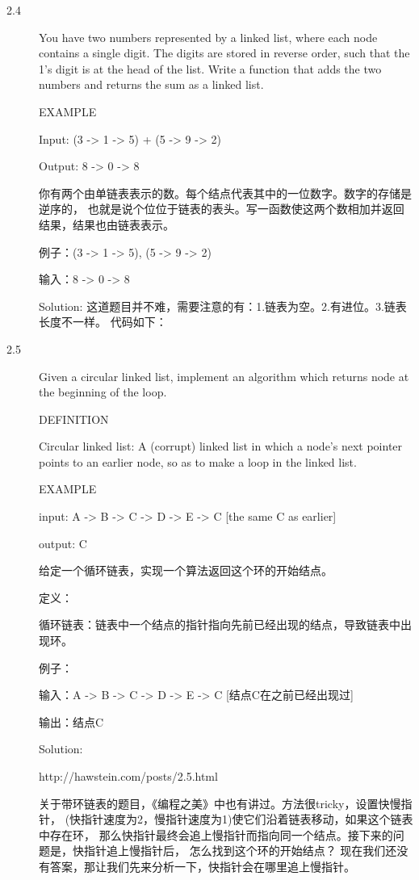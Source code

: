 \begin{description}



\item[2.4] You have two numbers represented by a linked list, where each node contains a single digit. The digits are stored in reverse order, such that the 1’s digit is at the head of the list. Write a function that adds the two numbers and returns the sum as a linked list.

EXAMPLE

Input: (3 -> 1 -> 5) + (5 -> 9 -> 2)

Output: 8 -> 0 -> 8

你有两个由单链表表示的数。每个结点代表其中的一位数字。数字的存储是逆序的， 也就是说个位位于链表的表头。写一函数使这两个数相加并返回结果，结果也由链表表示。

例子：(3 -> 1 -> 5), (5 -> 9 -> 2)

输入：8 -> 0 -> 8

Solution:
这道题目并不难，需要注意的有：1.链表为空。2.有进位。3.链表长度不一样。 代码如下：




\item[2.5] Given a circular linked list, implement an algorithm which returns node at the beginning of the loop.

DEFINITION

Circular linked list: A (corrupt) linked list in which a node’s next pointer points to an earlier node, so as to make a loop in the linked list.

EXAMPLE

input: A -> B -> C -> D -> E -> C [the same C as earlier]

output: C

给定一个循环链表，实现一个算法返回这个环的开始结点。

定义：

循环链表：链表中一个结点的指针指向先前已经出现的结点，导致链表中出现环。

例子：

输入：A -> B -> C -> D -> E -> C [结点C在之前已经出现过]

输出：结点C

Solution: 

http://hawstein.com/posts/2.5.html

关于带环链表的题目，《编程之美》中也有讲过。方法很tricky，设置快慢指针， (快指针速度为2，慢指针速度为1)使它们沿着链表移动，如果这个链表中存在环， 那么快指针最终会追上慢指针而指向同一个结点。接下来的问题是，快指针追上慢指针后， 怎么找到这个环的开始结点？ 现在我们还没有答案，那让我们先来分析一下，快指针会在哪里追上慢指针。


\end{description}
